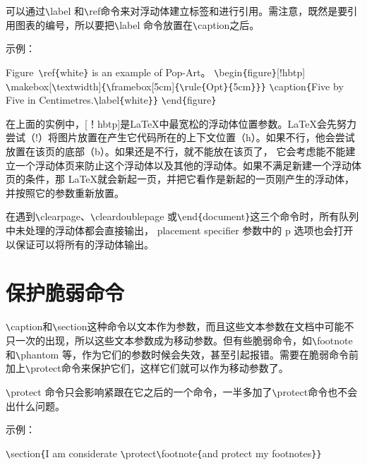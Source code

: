 \documentclass[UTF8]{ctexart}
\begin{document}
\qquad 可以通过\texttt{\textbackslash}label 和\texttt{\textbackslash}ref命令来对浮动体建立标签和进行引用。需注意，既然是要引用图表的编号，所以要把\texttt{\textbackslash}label 命令放置在\texttt{\textbackslash}caption之后。

示例：

Figure~\texttt{\textbackslash}ref\texttt{\{}white\texttt{\}} is an example of Pop-Art。
\texttt{\textbackslash}begin\texttt{\{}figure\texttt{\}}[!hbtp]
\texttt{\textbackslash}makebox[\texttt{\textbackslash}textwidth]\texttt{\{}\texttt{\textbackslash}framebox[5cm]\texttt{\{}\texttt{\textbackslash}rule\texttt{\{}Opt\texttt{\}}\texttt{\{}5cm\texttt{\}}\texttt{\}}\texttt{\}}
\texttt{\textbackslash}caption\texttt{\{}Five by Five in Centimetres.\texttt{\textbackslash}label\texttt{\{}white\texttt{\}}\texttt{\}}
\texttt{\textbackslash}end\texttt{\{}figure\texttt{\}}

\qquad 在上面的实例中，[！hbtp]是\LaTeX 中最宽松的浮动体位置参数。\LaTeX 会先努力尝试（!）将图片放置在产生它代码所在的上下文位置（h）。如果不行，他会尝试放置在该页的底部（b）。如果还是不行，就不能放在该页了，
它会考虑能不能建立一个浮动体页来防止这个浮动体以及其他的浮动体。如果不满足新建一个浮动体页的条件，那 \LaTeX 就会新起一页，并把它看作是新起的一页刚产生的浮动体，并按照它的参数重新放置。

\qquad 在遇到\texttt{\textbackslash}clearpage、\texttt{\textbackslash}cleardoublepage 或\texttt{\textbackslash}end\texttt{\{}document\texttt{\}}这三个命令时，所有队列中未处理的浮动体都会直接输出，
placement specifier 参数中的 p 选项也会打开以保证可以将所有的浮动体输出。

\section{保护脆弱命令}
\qquad \texttt{\textbackslash}caption和\texttt{\textbackslash}section这种命令以文本作为参数，而且这些文本参数在文档中可能不只一次的出现，所以这些文本参数成为移动参数。但有些脆弱命令，如\texttt{\textbackslash}footnote和\texttt{\textbackslash}phantom
等，作为它们的参数时候会失效，甚至引起报错。需要在脆弱命令前加上\texttt{\textbackslash}protect命令来保护它们，这样它们就可以作为移动参数了。

\qquad \texttt{\textbackslash}protect 命令只会影响紧跟在它之后的一个命令，一半多加了\texttt{\textbackslash}protect命令也不会出什么问题。

示例：

\texttt{\textbackslash}section\texttt{\{}I am considerate
        \texttt{\textbackslash}protect\texttt{\textbackslash}footnote\texttt{\{}and protect my footnotes\texttt{\}}\texttt{\}}
\end{document}
